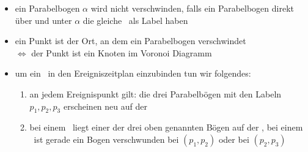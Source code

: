 \begin{itemize}
\begin{description}
\begin{description}
\begin{description}
								\begin{itemize}
									\item ein Parabelbogen $\alpha$ wird nicht verschwinden, falls ein Parabelbogen direkt über und unter $\alpha$ die gleiche \site~als Label haben
									\item ein Punkt ist der Ort, an dem ein Parabelbogen verschwindet\\ $\Longleftrightarrow$ der Punkt ist ein Knoten im Voronoi Diagramm
									\item um ein \kreis~in den Ereigniszeitplan einzubinden tun wir folgendes:
										\begin{enumerate}
											\item an jedem Ereignispunkt gilt: die drei Parabelbögen mit den Labeln $p_1,p_2,p_3$ erscheinen neu auf der \beach
											\item bei einem \site~liegt einer der drei oben genannten Bögen auf der \sweep, bei einem \kreis~ist gerade ein Bogen verschwunden bei $(p_1,p_2)$ oder bei $(p_2,p_3)$
											\setcounter{temp}{\value{enumi}}
										\end{enumerate}
								\end{itemize}
						\end{description}
				\end{description}
		\end{description}
\end{itemize}
\topbreak
\up\up\up\up
